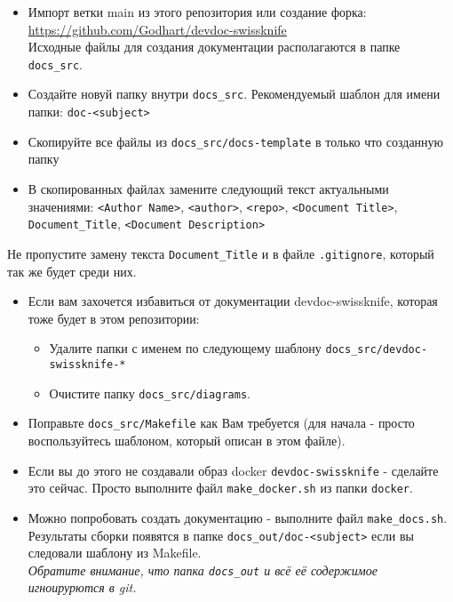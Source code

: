 \documentclass[12pt,a4paper,12pt,oneside,openany]{book}
\providecommand{\tightlist}{%
  \setlength{\itemsep}{0pt}\setlength{\parskip}{0pt}}
\begin{document}
\begin{itemize}
\item
  Импорт ветки main из этого репозитория или создание форка: \url{https://github.com/Godhart/devdoc-swissknife}\\
  Исходные файлы для создания документации располагаются в папке \texttt{docs\_src}.
\item
  Создайте новуй папку внутри \texttt{docs\_src}. Рекомендуемый шаблон для имени папки: \texttt{doc-\textless{}subject\textgreater{}}
\item
  Скопируйте все файлы из \texttt{docs\_src/docs-template} в только что созданную папку
\item
  В скопированных файлах замените следующий текст актуальными значениями: \texttt{\textless{}Author\ Name\textgreater{}}, \texttt{\textless{}author\textgreater{}}, \texttt{\textless{}repo\textgreater{}}, \texttt{\textless{}Document\ Title\textgreater{}}, \texttt{Document\_Title}, \texttt{\textless{}Document\ Description\textgreater{}}
\end{itemize}

Не пропустите замену текста \texttt{Document\_Title} и в файле \texttt{.gitignore}, который так же будет среди них.

\begin{itemize}
\item
  Если вам захочется избавиться от документации devdoc-swissknife, которая тоже будет в этом репозитории:

  \begin{itemize}
  \tightlist
  \item
    Удалите папки с именем по следующему шаблону \texttt{docs\_src/devdoc-swissknife-*}
  \item
    Очистите папку \texttt{docs\_src/diagrams}.
  \end{itemize}
\item
  Поправьте \texttt{docs\_src/Makefile} как Вам требуется (для начала - просто воспользуйтесь шаблоном, который описан в этом файле).
\item
  Если вы до этого не создавали образ docker \texttt{devdoc-swissknife} - сделайте это сейчас. Просто выполните файл \texttt{make\_docker.sh} из папки \texttt{docker}.
\item
  Можно попробовать создать документацию - выполните файл \texttt{make\_docs.sh}. Результаты сборки появятся в папке \texttt{docs\_out/doc-\textless{}subject\textgreater{}} если вы следовали шаблону из Makefile.\\
  \emph{Обратите внимание, что папка \texttt{docs\_out} и всё её содержимое игноирурются в git.}
\end{itemize}
\end{document}
